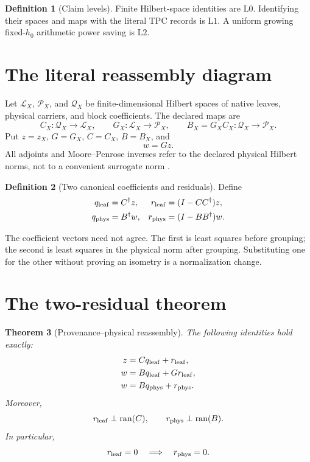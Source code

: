 \documentclass[11pt]{article}
\newtheorem{theorem}{Theorem}[section]
\theoremstyle{definition}
\newtheorem{definition}[theorem]{Definition}
\theoremstyle{remark}
\newcommand{\cL}{\mathcal L}
\newcommand{\cP}{\mathcal P}
\newcommand{\cQ}{\mathcal Q}
\newcommand{\Ran}{\operatorname{ran}}
\newcommand{\Lzero}{\mathrm{L0}}
\newcommand{\Lone}{\mathrm{L1}}
\newcommand{\Ltwo}{\mathrm{L2}}
\begin{document}
\begin{definition}[Claim levels]
Finite Hilbert-space identities are \(\Lzero\).  Identifying their
spaces and maps with the literal TPC records is \(\Lone\).  A uniform
growing fixed-\(h_0\) arithmetic power saving is \(\Ltwo\).
\end{definition}

\section{The literal reassembly diagram}

Let \(\cL_X\), \(\cP_X\), and \(\cQ_X\) be finite-dimensional Hilbert
spaces of native leaves, physical carriers, and block coefficients.
The declared maps are
\[
 C_X:\cQ_X\to\cL_X,\qquad
 G_X:\cL_X\to\cP_X,\qquad
 B_X=G_XC_X:\cQ_X\to\cP_X.
\]
Put \(z=z_X\), \(G=G_X\), \(C=C_X\), \(B=B_X\), and
\[
 w=Gz.
\]
All adjoints and Moore--Penrose inverses refer to the declared
physical Hilbert norms, not to a convenient surrogate norm
\citep{BenIsraelGreville,WangTPC113}.

\begin{definition}[Two canonical coefficients and residuals]
Define
\begin{align}
 q_{\rm leaf}&=C^\dagger z,
 &
 r_{\rm leaf}&=(I-CC^\dagger)z,
 \label{eq:leaf}\\
 q_{\rm phys}&=B^\dagger w,
 &
 r_{\rm phys}&=(I-BB^\dagger)w.
 \label{eq:phys}
\end{align}
\end{definition}

The coefficient vectors need not agree.  The first is least squares
before grouping; the second is least squares in the physical norm
after grouping.  Substituting one for the other without proving an
isometry is a normalization change.

\section{The two-residual theorem}

\begin{theorem}[Provenance--physical reassembly]
\label{thm:reassembly}
The following identities hold exactly:
\begin{align}
 z&=Cq_{\rm leaf}+r_{\rm leaf},
 \label{eq:zdec}\\
 w&=Bq_{\rm leaf}+Gr_{\rm leaf},
 \label{eq:wleaf}\\
 w&=Bq_{\rm phys}+r_{\rm phys}.
 \label{eq:wphys}
\end{align}
Moreover,
\[
 r_{\rm leaf}\perp\Ran(C),
 \qquad
 r_{\rm phys}\perp\Ran(B).
\]
In particular,
\[
 r_{\rm leaf}=0\quad\Longrightarrow\quad r_{\rm phys}=0.
\]
\end{theorem}
\end{document}
